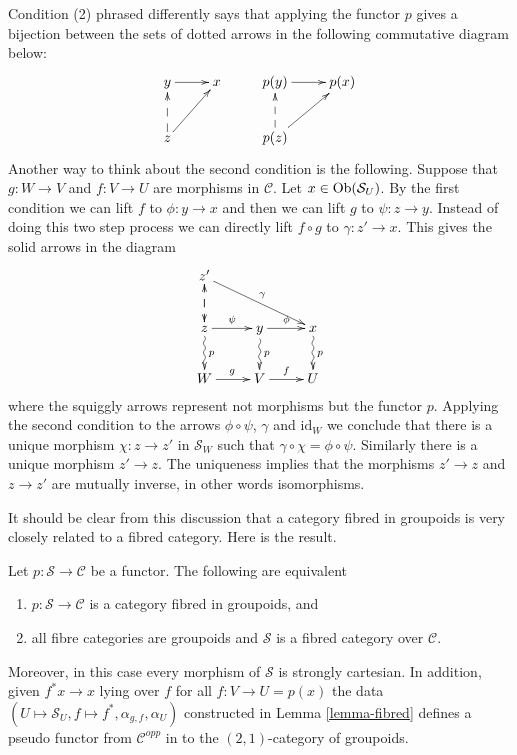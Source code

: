 \noindent
Condition (2) phrased differently says that
applying the functor $p$ gives a bijection between the sets
of dotted arrows in the following commutative diagram below:
$$
\xymatrix{
y \ar[r] & x & p(y) \ar[r] & p(x) \\
z \ar@{-->}[u] \ar[ru] & & p(z) \ar@{-->}[u]\ar[ru] & \\
}
$$
Another way to think about the second condition is the following.
Suppose that $g : W \to V$ and $f : V \to U$ are morphisms in $\mathcal{C}$.
Let $x \in \mathop{\mathrm{Ob}}\nolimits(\mathcal{S}_U)$. By the first condition we can lift
$f$ to $ \phi : y \to x$ and then we can lift $g$ to $\psi : z \to y$.
Instead of doing this two step process we can directly lift $f \circ g$ to
$\gamma : z' \to x$. This gives the solid arrows in the diagram
\begin{equation}
\label{equation-fibred-groupoids}
\vcenter{
\xymatrix{
z' \ar@{-->}[d]\ar[rrd]^\gamma & & \\
z \ar@{-->}[u] \ar[r]^\psi \ar@{~>}[d]^p &
y \ar[r]^\phi \ar@{~>}[d]^p &
x \ar@{~>}[d]^p
\\
W \ar[r]^g & V \ar[r]^f & U \\
}
}
\end{equation}
where the squiggly arrows represent not morphisms but the functor $p$.
Applying the second condition to the arrows $\phi \circ \psi$, $\gamma$
and $\text{id}_W$ we conclude that there is a unique morphism
$\chi : z \to z'$ in $\mathcal{S}_W$ such that
$\gamma \circ \chi = \phi \circ \psi$. Similarly there is a unique morphism
$z' \to z$. The uniqueness implies that the morphisms $z' \to z$ and
$z\to z'$ are mutually inverse, in other words isomorphisms.

\medskip\noindent
It should be clear from this discussion that a
category fibred in groupoids is very closely related
to a fibred category. Here is the result.

\begin{lemma}
\label{lemma-fibred-groupoids}
Let $p : \mathcal{S} \to \mathcal{C}$ be a functor.
The following are equivalent
\begin{enumerate}
\item $p : \mathcal{S} \to \mathcal{C}$ is a category
fibred in groupoids, and
\item all fibre categories are groupoids and
$\mathcal{S}$ is a fibred category over $\mathcal{C}$.
\end{enumerate}
Moreover, in this case every morphism of $\mathcal{S}$ is
strongly cartesian. In addition, given $f^\ast x \to x$
lying over $f$ for all $f: V \to U = p(x)$ the data
$(U \mapsto \mathcal{S}_U, f \mapsto f^*, \alpha_{g, f}, \alpha_U)$
constructed in Lemma \ref{lemma-fibred}
defines a pseudo functor from $\mathcal{C}^{opp}$ in to
the $(2, 1)$-category of groupoids.
\end{lemma}

